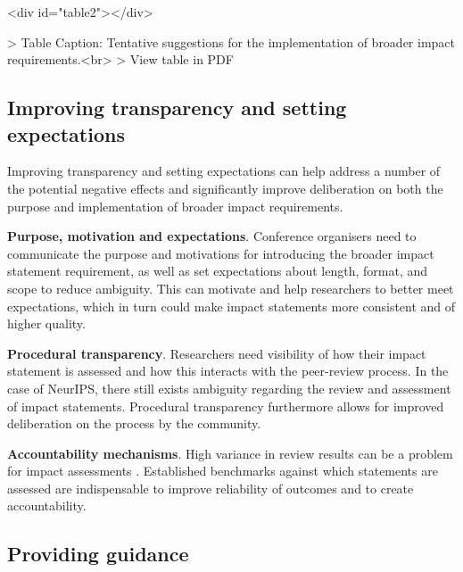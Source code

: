 \documentclass[11pt,english]{article}
\begin{document}
\begin{table}<div id="table2"></div>

> Table Caption: Tentative suggestions for the implementation of broader impact requirements.<br>
> View table in PDF
\end{table}

\subsection{Improving transparency and setting expectations}

Improving transparency and setting expectations can help address a number of the potential negative effects and significantly improve deliberation on both the purpose and implementation of broader impact requirements. 

\textbf{Purpose, motivation and expectations}. Conference organisers need to communicate the purpose and motivations for introducing the broader impact statement requirement, as well as set expectations about length, format, and scope to reduce ambiguity. This can motivate and help researchers to better meet expectations, which in turn could make impact statements more consistent and of higher quality. 

\textbf{Procedural transparency}. Researchers need visibility of how their impact statement is assessed and how this interacts with the peer-review process. In the case of NeurIPS, there still exists ambiguity regarding the review and assessment of impact statements. Procedural transparency furthermore allows for improved deliberation on the process by the community. 

\textbf{Accountability mechanisms}. High variance in review results can be a problem for impact assessments \citep{larson_survey_2004,shah_how_2004,mcwilliams_problematic_2003,goldman_inconsistency_1982}. Established benchmarks against which statements are assessed are indispensable to improve reliability of outcomes and to create accountability. 

\subsection{Providing guidance}
\end{document}

